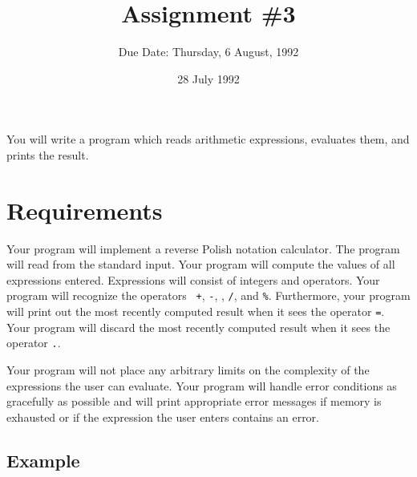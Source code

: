 

\def\brac#1{$<$#1$>$}
\def\Int{{\tt int}}
\def\int{\brac{\Int}}
\def\int{\brac{\Int}}
\def\Shortint{{\tt short~int}}
\def\shortint{\brac{\Shortint}}
\def\Longint{{\tt long~int}}
\def\longint{\brac{\Longint}}
\def\Float{{\tt float}}
\def\float{\brac{\Float}}
\def\Double{{\tt double}}
\def\double{\brac{\Double}}
\def\Char{{\tt char}}
\def\chr{\brac{\Char}}
\def\Void{{\tt void}}
\def\void{\brac{\Void}}

\def\ptr#1{pointer~to #1}
\def\p2#1{\brac{\ptr#1}}
\def\Ano#1#2{array~of {#1}~#2s}
\def\ano#1#2{\brac{\Ano#1#2}}
\def\Ao#1{array~of #1}
\def\ao#1{\brac{\Ao#1}}

\def\np{{\tt NULL} pointer}

\def\breakhere{\mbox{$\otimes$}}

\title{Assignment \#3}
\author{Due Date: Thursday, 6 August, 1992}
\date{28 July 1992}

\parskip 8pt


\maketitle

    You will write a program which reads arithmetic expressions,
evaluates them, and prints the result.

\section{Requirements}

Your program will implement a reverse Polish notation calculator.  The
program will read from the standard input.  Your program will compute
the values of all expressions entered.  Expressions will consist of
integers and operators.  Your program will recognize the operators {\tt
+}, {\tt -}, {\tt *}, {\tt /}, and {\tt \%}.  Furthermore, your program
will print out the most recently computed result when it sees the
operator {\tt =}.  Your program will discard the most recently computed
result when it sees the operator {\tt .}.  

Your program will not place any arbitrary limits on the complexity of
the expressions the user can evaluate.  Your program will handle error
conditions as gracefully as possible and will print appropriate error
messages if memory is exhausted or if the expression the user enters
contains an error.

\subsection{Example}

